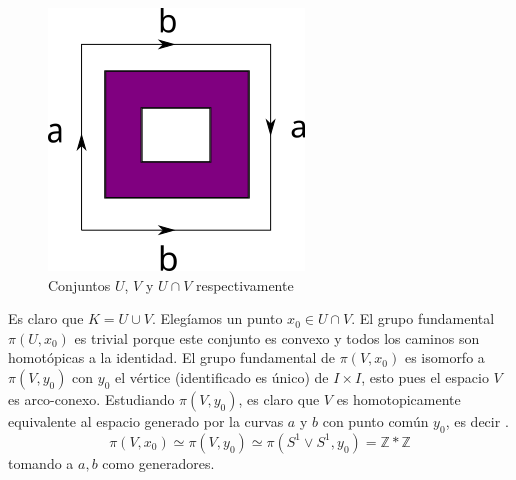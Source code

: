 \begin{ejemplo}
\begin{figure}[h]
    \hspace{3mm}
    \includegraphics[scale=0.5]{./imagenes/kleinUV.png}
    \caption*{Conjuntos \(U\), \(V\) y \(U \cap V\) respectivamente}
  \end{figure}
  Es claro que \(K = U \cup V\). Elegíamos un punto \(x_0 \in U \cap V\).
  El grupo fundamental \(\pi \left( U , x_0 \right) \) es trivial porque
  este conjunto es convexo y todos los caminos son homotópicas a la
  identidad. El grupo fundamental de \(\pi (V, x_0)\) es isomorfo a
  \(\pi (V, y_0)\) con \(y_0\) el vértice (identificado es único) de \(I
  \times I\), esto pues el espacio \(V\) es arco-conexo. Estudiando
  \(\pi (V, y_0)\), es claro que \(V\) es homotopicamente equivalente al
  espacio generado por la curvas \(a\) y \(b\) con punto común \(y_0\),
  es decir .
  \[ \pi (V, x_0) \simeq \pi (V, y_0) \simeq \pi (S^1 \vee S^1, y_0) =
    \mathbb Z * \mathbb Z \]
  tomando a \(a,b\) como generadores.


\end{ejemplo}

